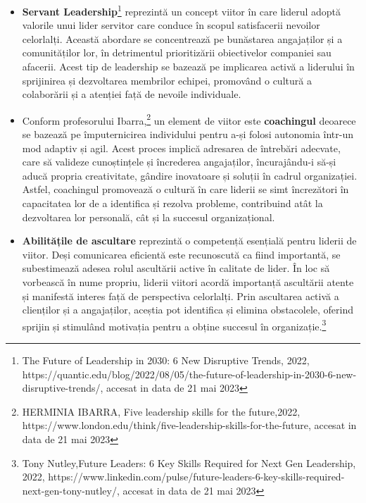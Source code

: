 \documentclass[a4paper, 12pt]{article}
\begin{document}
	\begin{itemize}
	\item \textbf{Servant Leadership}\footnote{The Future of Leadership in 2030: 6 New Disruptive Trends, 2022, https://quantic.edu/blog/2022/08/05/the-future-of-leadership-in-2030-6-new-disruptive-trends/, accesat in data de 21 mai 2023} reprezintă un concept viitor în care liderul adoptă valorile unui lider servitor care conduce în scopul satisfacerii nevoilor celorlalți. Această abordare se concentrează pe bunăstarea angajaților și a comunităților lor, în detrimentul prioritizării obiectivelor companiei sau afacerii. Acest tip de leadership se bazează pe implicarea activă a liderului în sprijinirea și dezvoltarea membrilor echipei, promovând o cultură a colaborării și a atenției față de nevoile individuale.

	\item Conform profesorului Ibarra,\footnote{HERMINIA IBARRA, Five leadership skills for the future,2022, https://www.london.edu/think/five-leadership-skills-for-the-future, accesat in data de 21 mai 2023}  un element de viitor este \textbf{coachingul} deoarece se bazează pe împuternicirea individului pentru a-și folosi autonomia într-un mod adaptiv și agil. Acest proces implică adresarea de întrebări adecvate, care să valideze cunoștințele și încrederea angajaților, încurajându-i să-și aducă propria creativitate, gândire inovatoare și soluții în cadrul organizației. Astfel, coachingul promovează o cultură în care liderii se simt încrezători în capacitatea lor de a identifica și rezolva probleme, contribuind atât la dezvoltarea lor personală, cât și la succesul organizațional.

\item \textbf{Abilitățile de ascultare} reprezintă o competență esențială pentru liderii de viitor. Deși comunicarea eficientă este recunoscută ca fiind importantă, se subestimează adesea rolul ascultării active în calitate de lider. În loc să vorbească în nume propriu, liderii viitori acordă importanță ascultării atente și manifestă interes față de perspectiva celorlalți. Prin ascultarea activă a clienților și a angajaților, aceștia pot identifica și elimina obstacolele, oferind sprijin și stimulând motivația pentru a obține succesul în organizație.\footnote{Tony Nutley,Future Leaders: 6 Key Skills Required for Next Gen Leadership, 2022, https://www.linkedin.com/pulse/future-leaders-6-key-skills-required-next-gen-tony-nutley/, accesat in data de 21 mai 2023} 

	\end{itemize}
\end{document}
